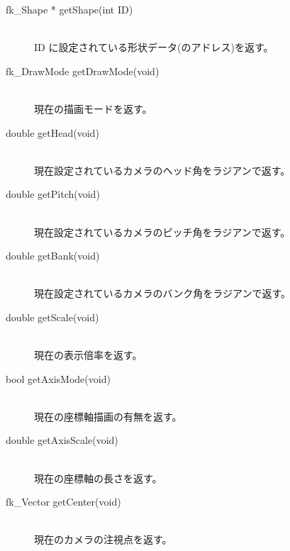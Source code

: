 \begin{description}
 \item[\hspace*{0.6cm}fk\_Shape * getShape(int ID)] ~ \\
	ID に設定されている形状データ(のアドレス)を返す。\\

 \item[\hspace*{0.6cm}fk\_DrawMode getDrawMode(void)] ~ \\
	現在の描画モードを返す。\\

 \item[\hspace*{0.6cm}double getHead(void)] ~ \\
	現在設定されているカメラのヘッド角をラジアンで返す。\\

 \item[\hspace*{0.6cm}double getPitch(void)] ~ \\
	現在設定されているカメラのピッチ角をラジアンで返す。\\

 \item[\hspace*{0.6cm}double getBank(void)] ~ \\
	現在設定されているカメラのバンク角をラジアンで返す。\\

 \item[\hspace*{0.6cm}double getScale(void)] ~ \\
	現在の表示倍率を返す。\\

 \item[\hspace*{0.6cm}bool getAxisMode(void)] ~ \\
	現在の座標軸描画の有無を返す。\\

 \item[\hspace*{0.6cm}double getAxisScale(void)] ~ \\
	現在の座標軸の長さを返す。\\

 \item[\hspace*{0.6cm}fk\_Vector getCenter(void)] ~ \\
	現在のカメラの注視点を返す。\\


\end{description}
